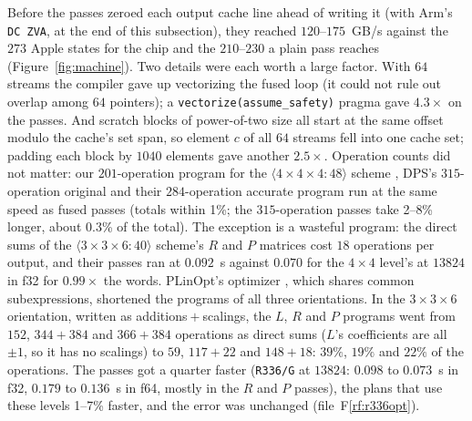 \documentclass[11pt]{article}
\newcommand{\rf}[1]{F\ref{rf:#1}}
\newcommand{\mm}[1]{\langle #1\rangle}
\newcommand{\lv}[1]{\texttt{#1}}
\begin{document}
Before the passes zeroed each output cache line ahead of writing it (with
Arm's \texttt{DC~ZVA}, at the end of this subsection), they reached
$120$--$175$~GB/s against the $273$ Apple states for the chip \cite{AppleM4Pro}
and the $210$--$230$ a plain pass reaches (Figure~\ref{fig:machine}).  Two
details were each worth a large factor.  With $64$ streams the compiler gave
up vectorizing the fused loop (it could not rule out overlap among $64$
pointers); a \texttt{vectorize(assume\_safety)} pragma gave $4.3\times$ on the
passes.  And scratch blocks of power-of-two size all start at the same offset
modulo the cache's set span, so element $c$ of all $64$ streams fell into one
cache set; padding each block by $1040$ elements gave another $2.5\times$.
Operation counts did not matter: our $201$-operation program for the
$\mm{4\times4\times4:48}$ scheme \cite{S26}, DPS's $315$-operation original and their
$284$-operation accurate program run at the same speed as fused passes
(totals within 1\%; the $315$-operation passes take 2--8\% longer, about
0.3\% of the total).  The exception is a wasteful program: the direct sums of
the $\mm{3\times3\times6:40}$ scheme's $R$ and $P$ matrices cost $18$ operations per
output, and their passes ran at $0.092$~s against $0.070$ for the $4\times4$
level's at $13824$ in f32 for $0.99\times$ the words.  PLinOpt's optimizer
\cite{PLinOpt}, which shares common subexpressions, shortened the programs
of all three orientations.  In the $3\times3\times6$ orientation, written as
additions${}+{}$scalings, the $L$, $R$ and $P$ programs went from $152$,
$344{+}384$ and $366{+}384$ operations as direct sums ($L$'s coefficients are
all $\pm1$, so it has no scalings) to $59$, $117{+}22$ and $148{+}18$: $39\%$,
$19\%$ and $22\%$ of the operations.  The passes got a quarter faster
(\lv{R336/G} at $13824$: $0.098$ to $0.073$~s in f32, $0.179$ to
$0.136$~s in f64, mostly in the $R$ and $P$ passes), the plans that use these
levels 1--7\% faster, and the error was unchanged
(file~\rf{r336opt}).
\end{document}
